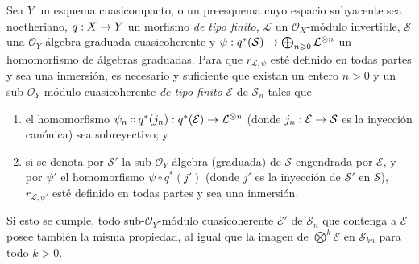 \documentclass[oneside,10pt]{amsart}
\makeatletter
\renewcommand{\geq}{\geqslant}
\newcommand{\ega@arrow}[2]{\mathchoice{#1}{#2}{#2}{#2}}
\renewcommand{\to}{\ega@arrow{\longrightarrow}{\rightarrow}}
\let\EGAOriginalLabel\label
\renewcommand{\label}[1]{\phantomsection\EGAOriginalLabel{#1}}
\makeatother
\begin{document}
\begin{proposition}[3.8.5]
\label{II.3.8.5-fr}
Sea $Y$ un esquema cuasicompacto, o un preesquema cuyo espacio subyacente sea noetheriano, $q:X\to Y$ un morfismo \emph{de tipo finito}, $\mathcal{L}$ un $\mathcal{O}_X$-módulo invertible, $\mathcal{S}$ una $\mathcal{O}_Y$-álgebra graduada cuasicoherente y $\psi:q^*(\mathcal{S})\to\bigoplus_{n\geq0}\mathcal{L}^{\otimes n}$ un homomorfismo de álgebras graduadas.
Para que $r_{\mathcal{L},\psi}$ esté definido en todas partes y sea una inmersión, es necesario y suficiente que existan un entero $n>0$ y un sub-$\mathcal{O}_Y$-módulo cuasicoherente \emph{de tipo finito} $\mathcal{E}$ de $\mathcal{S}_n$ tales que
\begin{enumerate}
  \item[\textup{a)}] el homomorfismo $\psi_n\circ q^*(j_n):q^*(\mathcal{E})\to\mathcal{L}^{\otimes n}$ (donde $j_n:\mathcal{E}\to\mathcal{S}$ es la inyección canónica) sea sobreyectivo; y
  \item[\textup{b)}] si se denota por $\mathcal{S}'$ la sub-$\mathcal{O}_Y$-álgebra (graduada) de $\mathcal{S}$ engendrada por $\mathcal{E}$, y por $\psi'$ el homomorfismo $\psi\circ q^*(j')$ (donde $j'$ es la inyección de $\mathcal{S}'$ en $\mathcal{S}$), $r_{\mathcal{L},\psi'}$ esté definido en todas partes y sea una inmersión.
\end{enumerate}

Si esto se cumple, todo sub-$\mathcal{O}_Y$-módulo cuasicoherente $\mathcal{E}'$ de $\mathcal{S}_n$ que contenga a $\mathcal{E}$ posee también la misma propiedad, al igual que la imagen de $\bigotimes^k\mathcal{E}$ en $\mathcal{S}_{kn}$ para todo $k>0$.
\end{proposition}
\end{document}
